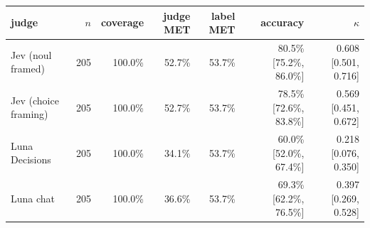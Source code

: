 \begin{tabular}{lrrrrrr}
\toprule
judge & $n$ & coverage & judge MET & label MET & accuracy & $\kappa$ \\
\midrule
Jev (noul framed) & 205 & 100.0\% & 52.7\% & 53.7\% & 80.5\% [75.2\%, 86.0\%] & 0.608 [0.501, 0.716] \\
Jev (choice framing) & 205 & 100.0\% & 52.7\% & 53.7\% & 78.5\% [72.6\%, 83.8\%] & 0.569 [0.451, 0.672] \\
Luna Decisions & 205 & 100.0\% & 34.1\% & 53.7\% & 60.0\% [52.0\%, 67.4\%] & 0.218 [0.076, 0.350] \\
Luna chat & 205 & 100.0\% & 36.6\% & 53.7\% & 69.3\% [62.2\%, 76.5\%] & 0.397 [0.269, 0.528] \\
\bottomrule
\end{tabular}
